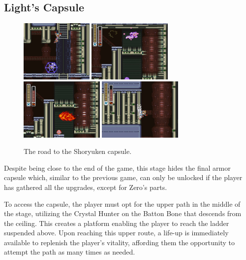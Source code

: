 \subsection{Light's Capsule}\label{X2:Shoryuken}
\begin{figure}[htp]
	\centering
	\includegraphics[height=3cm]{figures/X2/Hunter_stages/Shoryuken_1.png}
	\includegraphics[height=3cm]{figures/X2/Hunter_stages/Shoryuken_2.png}\\
	\vspace{2pt}
	\includegraphics[height=3cm]{figures/X2/Hunter_stages/Shoryuken_3.png}
	\includegraphics[height=3cm]{figures/X2/Hunter_stages/Shoryuken_4.png}
	\caption{The road to the Shoryuken capsule.}
\end{figure}
Despite being close to the end of the game, this stage hides the final armor capsule which, similar to the previous game, can only be unlocked if the player has gathered all the upgrades, except for Zero's parts.

To access the capsule, the player must opt for the upper path in the middle of the stage, utilizing the Crystal Hunter on the Batton Bone that descends from the ceiling. This creates a platform enabling the player to reach the ladder suspended above. Upon reaching this upper route, a life-up is immediately available to replenish the player's vitality, affording them the opportunity to attempt the path as many times as needed.

